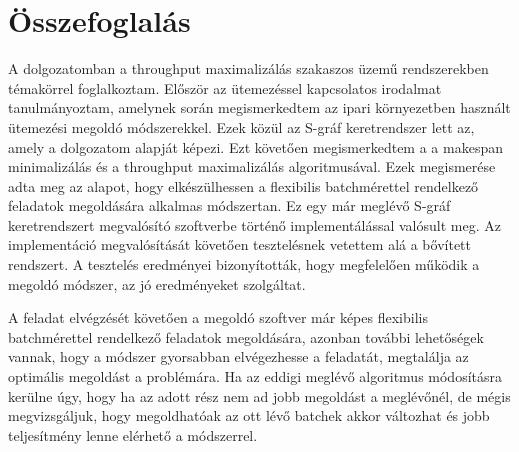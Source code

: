 \chapter{Összefoglalás}
A dolgozatomban a throughput maximalizálás szakaszos üzemű rendszerekben témakörrel foglalkoztam. Először az ütemezéssel kapcsolatos irodalmat tanulmányoztam, amelynek során megismerkedtem az ipari környezetben használt ütemezési megoldó módszerekkel. Ezek közül az S-gráf keretrendszer lett az, amely a dolgozatom alapját képezi. Ezt követően megismerkedtem a a makespan minimalizálás és a throughput maximalizálás algoritmusával. Ezek megismerése adta meg az alapot, hogy elkészülhessen a flexibilis batchmérettel rendelkező feladatok megoldására alkalmas módszertan. Ez egy már meglévő S-gráf keretrendszert megvalósító szoftverbe történő implementálással valósult meg. Az implementáció megvalósítását követően tesztelésnek vetettem alá a bővített rendszert. A tesztelés eredményei bizonyították, hogy megfelelően működik a megoldó módszer, az jó eredményeket szolgáltat.

A feladat elvégzését követően a megoldó szoftver már képes flexibilis batchmérettel rendelkező feladatok megoldására, azonban további lehetőségek vannak, hogy a módszer gyorsabban elvégezhesse a feladatát, megtalálja az optimális megoldást a problémára. Ha az eddigi meglévő algoritmus módosításra kerülne úgy, hogy ha az adott rész nem ad jobb megoldást a meglévőnél, de mégis megvizsgáljuk, hogy megoldhatóak az ott lévő batchek akkor változhat és jobb teljesítmény lenne elérhető a módszerrel.